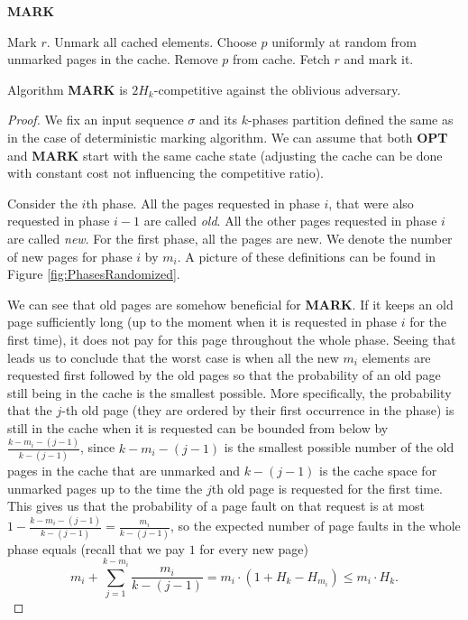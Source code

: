 \begin{algorithm}
\caption{\textbf{MARK}}
\label{alg:MARK}
\begin{algorithmic}[1]
    \State Mark $r$.
  \Else
	\State Unmark all cached elements.
      \EndIf
      \State Choose $p$ uniformly at random from unmarked pages in the cache.
      \State Remove $p$ from cache.
    \EndIf
    \State Fetch $r$ and mark it.
  \EndIf
\EndFor
\end{algorithmic}
\end{algorithm}
\begin{theorem}
\cite{markcom} Algorithm \textbf{MARK} is $2H_k$-competitive against the oblivious 
adversary.
\end{theorem}
\begin{proof}
We fix an input sequence $\sigma$ and its $k$-phases partition defined the same as 
in the case of deterministic marking algorithm. We can assume that both 
\textbf{OPT} and \textbf{MARK} start with the same cache state (adjusting the 
cache can be done with constant cost not influencing the competitive ratio).

Consider the $i$th phase. All the pages requested in 
phase $i$, that were also requested in phase $i-1$ are called \textit{old}. All the other pages requested 
in phase $i$ are called \textit{new}. For the first phase, all the pages are new. We 
denote the number of new pages for phase $i$ by $m_i$. A picture of these 
definitions can be found in Figure \ref{fig:PhasesRandomized}.


We can see that old pages are somehow beneficial for \textbf{MARK}. If it keeps 
an old page sufficiently long (up to the moment when it is requested 
in phase $i$ for the first time), it does not pay for this page throughout the whole phase. Seeing that 
leads us to conclude that the worst case is when all the new 
$m_i$ elements are requested first followed by the old pages so that the probability of an old 
page still being in the cache is the smallest possible. More specifically, the 
probability that the $j$-th old page (they are ordered by their first 
occurrence in the phase) is still in the cache when it is requested can be bounded from below by 
$\frac{k-m_i-(j-1)}{k-(j-1)}$, since $k-m_i-(j-1)$ is the smallest possible number of the old pages in 
the cache that are unmarked and $k-(j-1)$ is the cache space for unmarked pages 
up to the time the $j$th old page is requested for the first time. This gives us that 
the probability of a page fault on that request is at most $1 - 
\frac{k-m_i-(j-1)}{k-(j-1)} = \frac{m_i}{k-(j-1)}$, so the expected number of 
page faults in the whole phase equals (recall that we pay $1$ for every new page)
$$ m_i + \sum_{j=1}^{k - m_i}\frac{m_i}{k-(j-1)} = m_i\cdot(1+H_k-H_{m_i}) \leq 
m_i \cdot H_k.$$


\end{proof}
